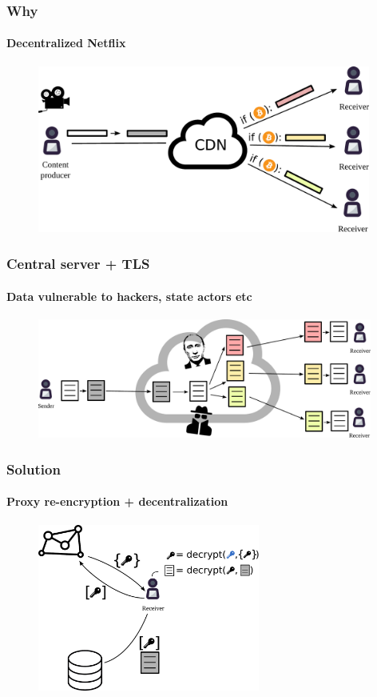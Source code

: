 \documentclass[xetex,mathsans,sans]{beamer}
\begin{document}
    \begin{frame}
        \frametitle{Why}
        \framesubtitle{Decentralized Netflix}
        \begin{figure}
            \centering
            \includegraphics[height=5.5cm]{pdf/streams.pdf}
        \end{figure}
    \end{frame}

    \begin{frame}
        \frametitle{Central server + TLS}
        \framesubtitle{Data vulnerable to hackers, state actors etc}
        \begin{figure}
            \centering
            \includegraphics[width=11cm]{pdf/file-sharing-tls.pdf}
        \end{figure}
    \end{frame}

    \begin{frame}
        \frametitle{Solution}
        \framesubtitle{Proxy re-encryption + decentralization}
        \begin{figure}
            \centering
            \includegraphics[height=5.5cm]{pdf/pre-kms.pdf}
        \end{figure}
    \end{frame}
\end{document}

